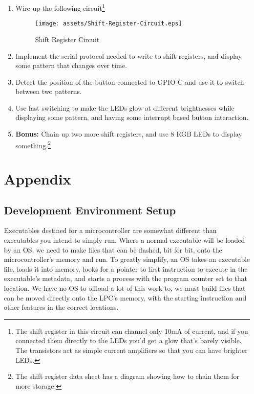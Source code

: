 \documentclass[]{article}
\makeatletter
\def\maxwidth{\ifdim\Gin@nat@width>\linewidth\linewidth
\else\Gin@nat@width\fi}
\let\Oldincludegraphics\includegraphics
\renewcommand{\includegraphics}[1]{\Oldincludegraphics[width=\maxwidth]{#1}}
\makeatother
\begin{document}
\begin{enumerate}
\def\labelenumi{\arabic{enumi}.}
\item
  Wire up the following circuit\footnote{The shift register in this
    circuit can channel only 10mA of current, and if you connected them
    directly to the LEDs you'd get a glow that's barely visible. The
    transistors act as simple current amplifiers so that you can have
    brighter LEDs.}

  \begin{figure}[htbp]
  \centering
  \texttt{[image: assets/Shift-Register-Circuit.eps]}
  \caption{Shift Register Circuit}
  \end{figure}
\item
  Implement the serial protocol needed to write to shift registers, and
  display some pattern that changes over time.
\item
  Detect the position of the button connected to GPIO C and use it to
  switch between two patterns.
\item
  Use fast switching to make the LEDs glow at different brightnesses
  while displaying some pattern, and having some interrupt based button
  interaction.
\item
  \textbf{Bonus:} Chain up two more shift registers, and use 8 RGB LEDs
  to display something.\footnote{The shift register data sheet has a
    diagram showing how to chain them for more storage.}
\end{enumerate}

\newpage

\section{Appendix}

\subsection{Development Environment Setup}

Executables destined for a microcontroller are somewhat different than
executables you intend to simply run. Where a normal executable will be
loaded by an OS, we need to make files that can be flashed, bit for bit,
onto the microcontroller's memory and run. To greatly simplify, an OS
takes an executable file, loads it into memory, looks for a pointer to
first instruction to execute in the executable's metadata, and starts a
process with the program counter set to that location. We have no OS to
offload a lot of this work to, we must build files that can be moved
directly onto the LPC's memory, with the starting instruction and other
features in the correct locations.
\end{document}
